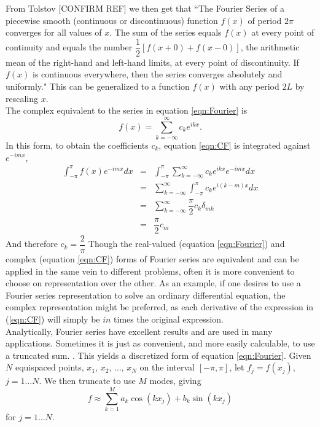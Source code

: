 \documentclass[11pt]{amsart}
\begin{document}
From Tolstov [CONFIRM REF] we then get that ``The Fourier Series of a piecewise smooth (continuous or discontinuous) function $f(x)$ of period $2\pi$ converges for all values of $x$. The sum of the series equals $f(x)$ at every point of continuity and equals the number $\dfrac{1}{2}[f(x+0)+f(x-0)]$, the arithmetic mean of the right-hand and left-hand limits, at every point of discontinuity. If $f(x)$ is continuous everywhere, then the series converges absolutely and uniformly."
This can be generalized to a function $f(x)$ with any period $2L$ by rescaling $x$.
\\
The complex equivalent to the series in equation \ref{eqn:Fourier} is 
\begin{equation}
\label{eqn:CF}
f(x)=\sum_{k=-\infty}^{\infty} c_k e^{ikx}.
\end{equation}
In this form, to obtain the coefficients $c_k$, equation \ref{eqn:CF} is integrated against $e^{-imx}$,
\begin{eqnarray}
\int_{-\pi}^{\pi} f(x)e^{-imx}dx &=& \int_{-\pi}^{\pi}\sum_{k=-\infty}^{\infty} c_k e^{ikx}e^{-imx}dx \\
&=& \sum_{k=-\infty}^{\infty} \int_{-\pi}^{\pi} c_k e^{i(k-m)x}dx \\
&=& \sum_{k=-\infty}^{\infty} \dfrac{\pi}{2} c_k \delta_{mk} \\
&=& \dfrac{\pi}{2}c_m
\end{eqnarray}
And therefore $c_k=\dfrac{2}{\pi}$
Though the real-valued (equation \ref{eqn:Fourier}) and complex (equation \ref{eqn:CF}) forms of Fourier series are equivalent and can be applied in the same vein to different problems, often it is more convenient to choose on representation over the other.  As an example, if one desires to use a Fourier series representation to solve an ordinary differential equation, the complex representation might be preferred, as each derivative of the expression in (\ref{eqn:CF}) will simply be $in$ times the original expression. \\

Analytically, Fourier series have excellent results and are used in many applications. Sometimes it is just as convenient, and more easily calculable, to use a truncated sum. .  This yields a discretized form of equation \ref{eqn:Fourier}.  Given $N$ equispaced points, $x_1$, $x_2$, $\ldots$, $x_N$ on the interval $[-\pi,\pi]$, let $f_j=f(x_j)$, $j=1\ldots N$.  We then truncate to use $M$ modes, giving
\begin{equation}\label{eqn:Discrete}
f \approx \sum_{k=1}^M a_k \cos(k x_j)+b_k \sin(k x_j)
\end{equation}
for $j=1\ldots N$. 
\\
\\
\end{document}
